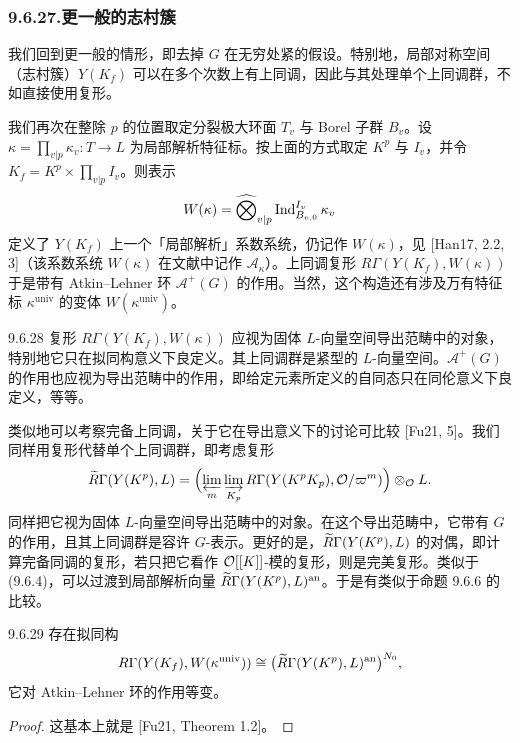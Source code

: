 \subsubsection*{9.6.27.\quad 更一般的志村簇}

我们回到更一般的情形，即去掉 $G$ 在无穷处紧的假设。特别地，局部对称空间（志村簇）$Y(K_f)$ 可以在多个次数上有上同调，因此与其处理单个上同调群，不如直接使用复形。

我们再次在整除 $p$ 的位置取定分裂极大环面 $T_v$ 与 Borel 子群 $B_v$。设 $\kappa=\prod_{v|p}\kappa_v:T\to L$ 为局部解析特征标。按上面的方式取定 $K^p$ 与 $I_v$，并令 $K_f=K^p\times\prod_{v|p}I_v$。则表示
\[
W(\kappa)=\widehat{\bigotimes}_{v|p}\operatorname{Ind}_{B_{v,0}}^{I_v}\kappa_v
\]
定义了 $Y(K_f)$ 上一个「局部解析」系数系统，仍记作 $W(\kappa)$，见 [Han17, 2.2, 3]（该系数系统 $W(\kappa)$ 在文献中记作 $\mathcal A_\kappa$）。上同调复形 $R\Gamma(Y(K_f),W(\kappa))$ 于是带有 Atkin--Lehner 环 $\mathcal A^+(G)$ 的作用。当然，这个构造还有涉及万有特征标 $\kappa^{\mathrm{univ}}$ 的变体 $W(\kappa^{\mathrm{univ}})$。

\begin{rem}{9.6.28}\label{rem:a4-16-9-6-28}
复形 $R\Gamma(Y(K_f),W(\kappa))$ 应视为固体 $L$-向量空间导出范畴中的对象，特别地它只在拟同构意义下良定义。其上同调群是紧型的 $L$-向量空间。$\mathcal A^+(G)$ 的作用也应视为导出范畴中的作用，即给定元素所定义的自同态只在同伦意义下良定义，等等。
\end{rem}

类似地可以考察完备上同调，关于它在导出意义下的讨论可比较 [Fu21, 5]。我们同样用复形代替单个上同调群，即考虑复形
\[
\widetilde R\Gamma(Y(K^p),L)=\Bigl(\varprojlim_{m}\varinjlim_{K_p}R\Gamma(Y(K^pK_p),\mathcal{O}/\varpi^m)\Bigr)\otimes_{\mathcal{O}}L.
\]
同样把它视为固体 $L$-向量空间导出范畴中的对象。在这个导出范畴中，它带有 $G$ 的作用，且其上同调群是容许 $G$-表示。更好的是，$\widetilde R\Gamma(Y(K^p),L)$ 的对偶，即计算完备同调的复形，若只把它看作 $\mathcal{O}[[K]]$-模的复形，则是完美复形。类似于 (9.6.4)，可以过渡到局部解析向量 $\widetilde R\Gamma(Y(K^p),L)^{\mathrm{an}}$。于是有类似于命题 9.6.6 的比较。

\begin{prop}{9.6.29}\label{prop:a4-16-9-6-29}
存在拟同构
\[
R\Gamma(Y(K_f),W(\kappa^{\mathrm{univ}}))\cong\bigl(\widetilde R\Gamma(Y(K^p),L)^{\mathrm{an}}\bigr)^{N_0},
\]
它对 Atkin--Lehner 环的作用等变。
\end{prop}

\begin{proof}
这基本上就是 [Fu21, Theorem 1.2]。
\end{proof}

